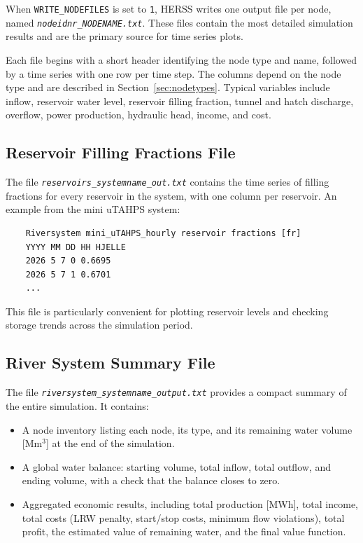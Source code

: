 \documentclass[a4paper, 12pt]{report}
\newcommand{\file}[1]{\textit{\texttt{#1}}}  %
\begin{document}
	When \texttt{WRITE\_NODEFILES} is set to \texttt{1}, HERSS writes one output file per node,
	named \file{node\textit{idnr}\_\textit{NODENAME}.txt}. These files contain the most
	detailed simulation results and are the primary source for time series plots.

	Each file begins with a short header identifying the node type and name, followed by a
	time series with one row per time step. The columns depend on the node type and are
	described in Section~\ref{sec:nodetypes}. Typical variables include inflow,
	reservoir water level, reservoir filling fraction, tunnel and hatch discharge, overflow,
	power production, hydraulic head, income, and cost.

	\subsection{Reservoir Filling Fractions File}

	The file \file{reservoirs\_\textit{systemname}\_out.txt} contains the time series of
	filling fractions for every reservoir in the system, with one column per reservoir. An
	example from the mini uTAHPS system:

	\begin{verbatim}
	Riversystem mini_uTAHPS_hourly reservoir fractions [fr]
	YYYY MM DD HH HJELLE
	2026 5 7 0 0.6695
	2026 5 7 1 0.6701
	...
	\end{verbatim}

	This file is particularly convenient for plotting reservoir levels and checking storage
	trends across the simulation period.

	\subsection{River System Summary File}

	The file \file{riversystem\_\textit{systemname}\_output.txt} provides a compact summary of
	the entire simulation. It contains:

	\begin{itemize}
	\item A node inventory listing each node, its type, and its remaining water volume
	[Mm$^3$] at the end of the simulation.
	\item A global water balance: starting volume, total inflow, total outflow, and ending
	volume, with a check that the balance closes to zero.
	\item Aggregated economic results, including total production [MWh], total income,
	total costs (LRW penalty, start/stop costs, minimum flow violations), total profit,
	the estimated value of remaining water, and the final value function.
	\end{itemize}
\end{document}
